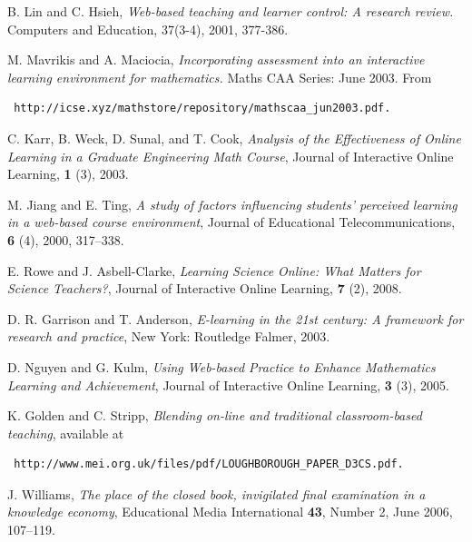 \documentclass{amsart}
\begin{document}
\begin{thebibliography}{12345}

 B. Lin and C. Hsieh, \emph{Web-based teaching and learner control: A research
review.} Computers and Education, 37(3-4), 2001, 377-386.

M. Mavrikis and A. Maciocia, \emph{ Incorporating assessment into an interactive
learning environment for mathematics.} Maths CAA Series: June 2003.  From \begin{verbatim} http://icse.xyz/mathstore/repository/mathscaa_jun2003.pdf. \end{verbatim}


 C. Karr, B. Weck, D. Sunal, and T. Cook, \emph{Analysis of the Effectiveness of Online 	 Learning in a Graduate Engineering Math Course}, Journal of Interactive Online 	Learning, \textbf{1} (3), 2003.

 M. Jiang and E. Ting, \emph{A study of factors influencing students' perceived learning in a 	 web-based course environment}, Journal of Educational Telecommunications, \textbf{6} (4), 2000,	317--338.

 E. Rowe and J. Asbell-Clarke, \emph{Learning Science Online: What Matters for Science 	Teachers?}, Journal of Interactive Online Learning, \textbf{7} (2), 2008.

 D. R. Garrison and T. Anderson, \emph{E-learning in the 21st century: A framework for 	research and practice}, New York: Routledge Falmer, 2003.

 D. Nguyen and G. Kulm, \emph{Using Web-based Practice to Enhance Mathematics 	Learning and Achievement}, Journal of Interactive Online Learning, \textbf{3} (3), 2005.

 K. Golden and C. Stripp, \emph{Blending on-line and traditional classroom-based teaching}, available at \begin{verbatim} http://www.mei.org.uk/files/pdf/LOUGHBOROUGH_PAPER_D3CS.pdf. \end{verbatim}

 J. Williams, \emph{The place of the closed book, invigilated final examination in a knowledge economy}, Educational Media International \textbf{43}, Number 2, June 2006, 107--119.

\end{thebibliography}
\end{document}
